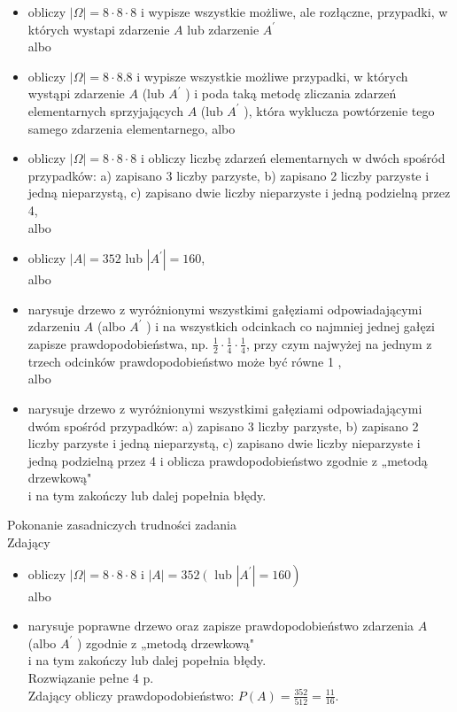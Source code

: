 \documentclass[10pt]{article}
\begin{document}
\begin{itemize}
  \item obliczy $|\Omega|=8 \cdot 8 \cdot 8$ i wypisze wszystkie możliwe, ale rozłączne, przypadki, w których wystapi zdarzenie $A$ lub zdarzenie $A^{\prime}$\\
albo
  \item obliczy $|\Omega|=8 \cdot 8.8$ i wypisze wszystkie możliwe przypadki, w których wystąpi zdarzenie $A$ (lub $A^{\prime}$ ) i poda taką metodę zliczania zdarzeń elementarnych sprzyjających $A$ (lub $A^{\prime}$ ), która wyklucza powtórzenie tego samego zdarzenia elementarnego, albo
  \item obliczy $|\Omega|=8 \cdot 8 \cdot 8$ i obliczy liczbę zdarzeń elementarnych w dwóch spośród przypadków: a) zapisano 3 liczby parzyste, b) zapisano 2 liczby parzyste i jedną nieparzystą, c) zapisano dwie liczby nieparzyste i jedną podzielną przez 4,\\
albo
  \item obliczy $|A|=352$ lub $\left|A^{\prime}\right|=160$,\\
albo
  \item narysuje drzewo z wyróżnionymi wszystkimi gałęziami odpowiadającymi zdarzeniu $A$ (albo $A^{\prime}$ ) i na wszystkich odcinkach co najmniej jednej gałęzi zapisze prawdopodobieństwa, np. $\frac{1}{2} \cdot \frac{1}{4} \cdot \frac{1}{4}$, przy czym najwyżej na jednym z trzech odcinków prawdopodobieństwo może być równe 1 ,\\
albo
  \item narysuje drzewo z wyróżnionymi wszystkimi gałęziami odpowiadającymi dwóm spośród przypadków: a) zapisano 3 liczby parzyste, b) zapisano 2 liczby parzyste i jedną nieparzystą, c) zapisano dwie liczby nieparzyste i jedną podzielną przez 4 i oblicza prawdopodobieństwo zgodnie z „metodą drzewkową"\\
i na tym zakończy lub dalej popełnia błędy.
\end{itemize}

Pokonanie zasadniczych trudności zadania\\
Zdający

\begin{itemize}
  \item obliczy $|\Omega|=8 \cdot 8 \cdot 8$ i $|A|=352\left(\right.$ lub $\left.\left|A^{\prime}\right|=160\right)$\\
albo
  \item narysuje poprawne drzewo oraz zapisze prawdopodobieństwo zdarzenia $A$ (albo $A^{\prime}$ ) zgodnie z „metodą drzewkową"\\
i na tym zakończy lub dalej popełnia błędy.\\
Rozwiązanie pełne 4 p.\\
Zdający obliczy prawdopodobieństwo: $P(A)=\frac{352}{512}=\frac{11}{16}$.
\end{itemize}
\end{document}
